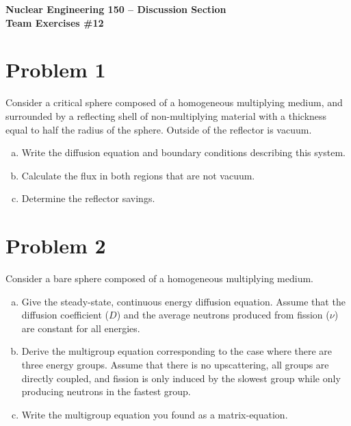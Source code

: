 \documentclass{report}
\begin{document}
\begin{center}
\textbf{\large Nuclear Engineering 150 -- Discussion Section}\\ 
\textbf{Team Exercises \#12}
\end{center}

\section*{Problem 1}

Consider a critical sphere composed of a homogeneous multiplying medium, and surrounded by a reflecting shell of non-multiplying material with a thickness equal to half the radius of the sphere. Outside of the reflector is vacuum.
\begin{enumerate}[a)]
\item Write the diffusion equation and boundary conditions describing this system.
\item Calculate the flux in both regions that are not vacuum.
\item Determine the reflector savings.
\end{enumerate}




\newpage
\section*{Problem 2}

Consider a bare sphere composed of a homogeneous multiplying medium.
\begin{enumerate}[a)]
\item Give the steady-state, continuous energy diffusion equation. Assume that the diffusion coefficient ($D$) and the average neutrons produced from fission ($\nu$) are constant for all energies.
\item Derive the multigroup equation corresponding to the case where there are three energy groups. Assume that there is no upscattering, all groups are directly coupled, and fission is only induced by the slowest group while only producing neutrons in the fastest group.
\item Write the multigroup equation you found as a matrix-equation.
\end{enumerate}
\end{document}

